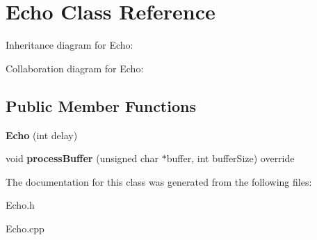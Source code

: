 \hypertarget{classEcho}{}\section{Echo Class Reference}
\label{classEcho}


Inheritance diagram for Echo\+:


Collaboration diagram for Echo\+:
\subsection*{Public Member Functions}
\begin{DoxyCompactItemize}
\item 
\mbox{\label{classEcho_a9531515ffab8be1e38cbdc0e0e9338a6}} 
{\bfseries Echo} (int delay)
\item 
\mbox{\label{classEcho_ae915d9d4065a34411d18791a5ae9006b}} 
void {\bfseries process\+Buffer} (unsigned char $\ast$buffer, int buffer\+Size) override
\end{DoxyCompactItemize}


The documentation for this class was generated from the following files\+:\begin{DoxyCompactItemize}
\item 
Echo.\+h\item 
Echo.\+cpp\end{DoxyCompactItemize}
